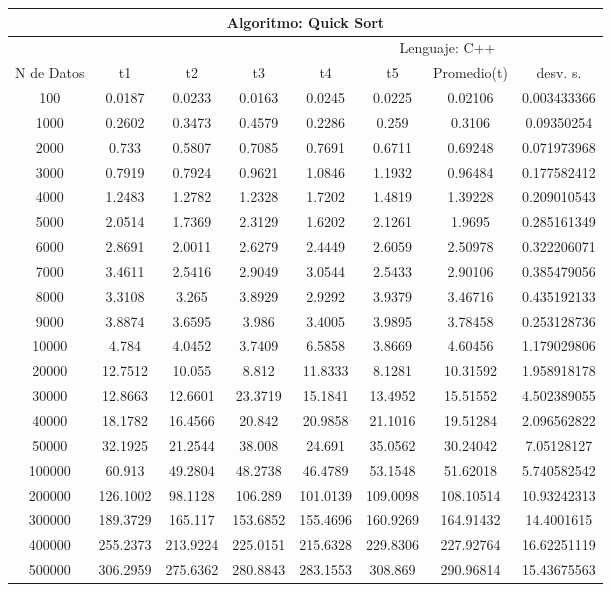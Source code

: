 \documentclass{article}
\begin{document}
    
    \begin{table}[]
        \begin{tabular}{|c|c|c|c|c|c|c|c| }
            \hline
            \multicolumn{8}{|c|}{Algoritmo: Quick Sort} \\ \hline
            \multicolumn{4}{|c|}{} & \multicolumn{4}{c|}{Lenguaje: C++} \\ \hline
              N de Datos &     t1    &  t2         &  t3          &   t4        &    t5     &   Promedio(t)       & desv. s. \\ \hline        
100	    &0.0187	&0.0233	&0.0163	&0.0245	&0.0225	&0.02106	&0.003433366 \\ \hline   
1000	&0.2602	&0.3473	&0.4579	&0.2286	&0.259	&0.3106	&0.09350254 \\ \hline   
2000	&0.733	&0.5807	&0.7085	&0.7691	&0.6711	&0.69248	&0.071973968 \\ \hline   
3000	&0.7919	&0.7924	&0.9621	&1.0846	&1.1932	&0.96484	&0.177582412 \\ \hline   
4000	&1.2483	&1.2782	&1.2328	&1.7202	&1.4819	&1.39228	&0.209010543 \\ \hline   
5000	&2.0514	&1.7369	&2.3129	&1.6202	&2.1261	&1.9695	&0.285161349 \\ \hline   
6000	&2.8691	&2.0011	&2.6279	&2.4449	&2.6059	&2.50978	&0.322206071 \\ \hline   
7000	&3.4611	&2.5416	&2.9049	&3.0544	&2.5433	&2.90106	&0.385479056 \\ \hline   
8000	&3.3108	&3.265	&3.8929	&2.9292	&3.9379	&3.46716	&0.435192133 \\ \hline   
9000	&3.8874	&3.6595	&3.986	&3.4005	&3.9895	&3.78458	&0.253128736 \\ \hline   
10000	&4.784	&4.0452	&3.7409	&6.5858	&3.8669	&4.60456	&1.179029806 \\ \hline   
20000	&12.7512	&10.055	&8.812	&11.8333	&8.1281	&10.31592&	1.958918178 \\ \hline   
30000	&12.8663	&12.6601	&23.3719	&15.1841	&13.4952	&15.51552&	4.502389055 \\ \hline   
40000	&18.1782	&16.4566	&20.842	&20.9858	&21.1016	&19.51284&	2.096562822 \\ \hline   
50000	&32.1925	&21.2544	&38.008	&24.691	&35.0562	&30.24042&	7.05128127 \\ \hline   
100000	&60.913	&49.2804	&48.2738	&46.4789	&53.1548	&51.62018&	5.740582542 \\ \hline   
200000	&126.1002	&98.1128	    &106.289	    &101.0139	&109.0098&	108.10514&	10.93242313 \\ \hline   
300000	&189.3729	&165.117	    &153.6852	&155.4696	&160.9269&	164.91432&	14.4001615 \\ \hline   
400000	&255.2373	&213.9224	&225.0151	&215.6328	&229.8306&	227.92764&	16.62251119 \\ \hline   
500000	&306.2959	&275.6362	&280.8843	&283.1553	&308.869	 &    290.96814&	15.43675563 \\ \hline   
        
        
        \end{tabular}
    \end{table}        
\end{document}
